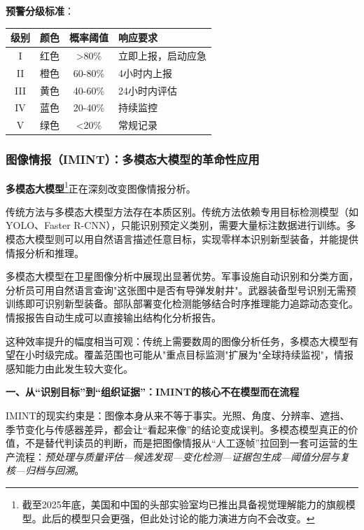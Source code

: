     {\bfseries 预警分级标准}：
\begin{center}
\begin{tabular}{cccl}
\toprule
            {\bfseries 级别} & \textbf{颜色} & \textbf{概率阈值} & \textbf{响应要求} \\
\midrule
I & 红色 & >80\% & 立即上报，启动应急 \\
II & 橙色 & 60-80\% & 4小时内上报 \\
III & 黄色 & 40-60\% & 24小时内评估 \\
IV & 蓝色 & 20-40\% & 持续监控 \\
V & 绿色 & <20\% & 常规记录 \\
\bottomrule
\end{tabular}
\end{center}


\subsubsection{图像情报（IMINT）：多模态大模型的革命性应用}

    {\bfseries 多模态大模型}\footnote{截至2025年底，美国和中国的头部实验室均已推出具备视觉理解能力的旗舰模型。此后的模型只会更强，但此处讨论的能力演进方向不会改变。}正在深刻改变图像情报分析。

传统方法与多模态大模型方法存在本质区别。传统方法依赖专用目标检测模型（如YOLO、Faster R-CNN），只能识别预定义类别，需要大量标注数据进行训练。多模态大模型则可以用自然语言描述任意目标，实现零样本识别新型装备，并能提供情报分析和推理。

多模态大模型在卫星图像分析中展现出显著优势。军事设施自动识别和分类方面，分析员可用自然语言查询"这张图中是否有导弹发射井"。武器装备型号识别无需预训练即可识别新型装备。部队部署变化检测能够结合时序推理能力追踪动态变化。情报报告自动生成可以直接输出结构化分析报告。

这种效率提升的幅度相当可观：传统上需要数周的图像分析任务，多模态大模型有望在小时级完成。覆盖范围也可能从"重点目标监测"扩展为"全球持续监视"，情报感知能力由此发生较大变化。


    {\bfseries 一、从“识别目标”到“组织证据”：IMINT的核心不在模型而在流程}

IMINT的现实约束是：图像本身从来不等于事实。光照、角度、分辨率、遮挡、季节变化与传感器差异，都会让“看起来像”的结论变成误判。多模态模型真正的价值，不是替代判读员的判断，而是把图像情报从“人工逐帧”拉回到一套可运营的生产流程：\emph{预处理与质量评估—候选发现—变化检测—证据包生成—阈值分层与复核—归档与回溯}。

